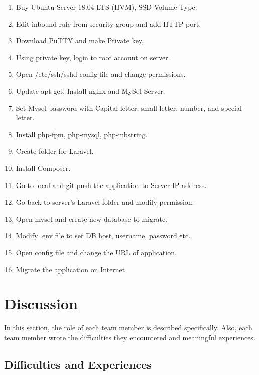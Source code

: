 \documentclass[letterpaper, 10 pt, conference]{ieeeconf}  %
\begin{document}
\begin{enumerate}
\item Buy Ubuntu Server 18.04 LTS (HVM), SSD Volume Type.
\item Edit inbound rule from security group and add HTTP port.
\item Download PuTTY and make Private key, 
\item Using private key, login to root account on server.
\item Open /etc/ssh/sshd config file and change permissions.
\item Update apt-get, Install nginx and MySql Server.
\item Set Mysql password with Capital letter, small letter, number, and special letter.
\item Install php-fpm, php-mysql, php-mbstring.
\item Create folder for Laravel.
\item Install Composer.
\item Go to local and git push the application to Server IP address.
\item Go back to server's Laravel folder and modify permission.
\item Open mysql and create new database to migrate.
\item Modify .env file to set DB host, username, password etc.
\item Open config file and change the URL of application.
\item Migrate the application on Internet.
\end{enumerate}
\section{Discussion}
In this section, the role of each team member is described specifically. Also, each team member wrote the difficulties they encountered and meaningful experiences. 


\subsection{Difficulties and Experiences}
\end{document}

